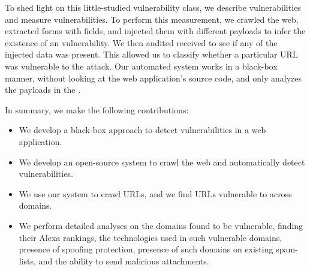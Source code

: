 To shed light on this little-studied vulnerability class, we describe
\ehi vulnerabilities and measure \ehi vulnerabilities. To perform this
measurement, we crawled the web, extracted forms with \email fields,
and injected them with different payloads to infer the existence of an
\ehi vulnerability. We then audited received \emails to see if any of
the injected data was present. This allowed us to classify whether a
particular URL was vulnerable to the attack. Our automated system
works in a black-box manner, without looking at the web application's
source code, and only analyzes the payloads in the \emails.

In summary, we make the following contributions:
\begin{itemize}

\item We develop a black-box approach to detect \ehi vulnerabilities in a web application.

\item We develop an open-source system to crawl the web and automatically detect \ehi vulnerabilities.

\item We use our system to crawl \urls URLs, and we find \success URLs vulnerable to \ehi across \domains domains. 

\item We perform detailed analyses on the domains found to be vulnerable, finding their Alexa rankings, the technologies used in such vulnerable domains, presence of \email spoofing protection, presence of such domains on existing spam-lists, and the ability to send malicious attachments.

\end{itemize}
